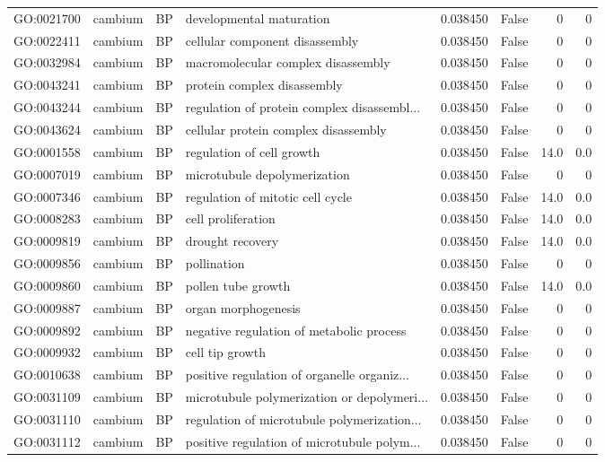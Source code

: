 \begin{longtable}{llllrlrr}
GO:0021700 & cambium & BP &   developmental maturation  & 0.038450 &   False  & 0 & 0 \\
GO:0022411 & cambium & BP &   cellular component disassembly  & 0.038450 &   False  & 0 & 0 \\
GO:0032984 & cambium & BP &   macromolecular complex disassembly  & 0.038450 &   False  & 0 & 0 \\
GO:0043241 & cambium & BP &   protein complex disassembly  & 0.038450 &   False  & 0 & 0 \\
GO:0043244 & cambium & BP &   regulation of protein complex disassembl...  & 0.038450 &   False  & 0 & 0 \\
GO:0043624 & cambium & BP &   cellular protein complex disassembly  & 0.038450 &   False  & 0 & 0 \\
GO:0001558 & cambium & BP &   regulation of cell growth  & 0.038450 &   False  & 14.0 & 0.0 \\ 
GO:0007019 & cambium & BP &   microtubule depolymerization  & 0.038450 &   False  & 0 & 0 \\
GO:0007346 & cambium & BP &   regulation of mitotic cell cycle  & 0.038450 &   False  & 14.0 & 0.0 \\ 
GO:0008283 & cambium & BP &   cell proliferation  & 0.038450 &   False  & 14.0 & 0.0 \\ 
GO:0009819 & cambium & BP &   drought recovery  & 0.038450 &   False  & 14.0 & 0.0 \\ 
GO:0009856 & cambium & BP &   pollination  & 0.038450 &   False  & 0 & 0 \\
GO:0009860 & cambium & BP &   pollen tube growth  & 0.038450 &   False  & 14.0 & 0.0 \\ 
GO:0009887 & cambium & BP &   organ morphogenesis  & 0.038450 &   False  & 0 & 0 \\
GO:0009892 & cambium & BP &   negative regulation of metabolic process  & 0.038450 &   False  & 0 & 0 \\
GO:0009932 & cambium & BP &   cell tip growth  & 0.038450 &   False  & 0 & 0 \\
GO:0010638 & cambium & BP &   positive regulation of organelle organiz...  & 0.038450 &   False  & 0 & 0 \\
GO:0031109 & cambium & BP &   microtubule polymerization or depolymeri...  & 0.038450 &   False  & 0 & 0 \\
GO:0031110 & cambium & BP &   regulation of microtubule polymerization...  & 0.038450 &   False  & 0 & 0 \\
GO:0031112 & cambium & BP &   positive regulation of microtubule polym...  & 0.038450 &   False  & 0 & 0 \\

\end{longtable}
